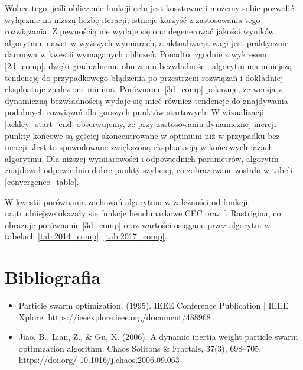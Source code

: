 \documentclass[12pt]{article}
\begin{document}
Wobec tego, jeśli obliczenie funkcji celu jest kosztowne i możemy sobie pozwolić wyłącznie na niższą liczbę iteracji, istnieje korzyść z zastosowania tego rozwiązania.
Z pewnością nie wydaje się ono degenerować jakości wyników algorytmu, nawet w wyższych wymiarach, a aktualizacja wagi jest praktycznie darmowa w kwestii wymaganych obliczeń.
Ponadto, zgodnie z wykresem \ref{2d_comp}, dzięki gradualnemu obniżaniu bezwładności, algorytm ma mniejszą tendencję do przypadkowego błądzenia po przestrzeni rozwiązań i
dokładniej eksploatuje znalezione minima. Porównanie \ref{3d_comp} pokazuje, że wersja z dynamiczną bezwładnością wydaje się mieć również tendencje do znajdywania podobnych
rozwiązań dla gorszych punktów startowych. W wizualizacji \ref{ackley_start_end} obserwujemy, że przy zastosowaniu dynamicznej inercji punkty końcowe są gęściej skoncentrowane
w optimum niż w przypadku bez inercji. Jest to spowodowane zwiększoną eksploatacją w końcowych fazach algorytmu. Dla niższej wymiarowości i odpowiednich parametrów, algorytm znajdował
odpowiednio dobre punkty szybciej, co zobrazowane zostało w tabeli \ref{convergence_table}.

W kwestii porównania zachowań algorytmu w zależności od funkcji, najtrudniejsze okazały się funkcje benchmarkowe CEC oraz f. Rastrigina, co obrazuje porównanie \ref{3d_comp} oraz wartości osiągane
przez algorytm w tabelach \ref{tab:2014_comp}, \ref{tab:2017_comp}.

\section{Bibliografia}
\begin{itemize}
	\item{Particle swarm optimization. (1995). IEEE Conference Publication | IEEE Xplore. https://ieeexplore.ieee.org/document/488968}
	\item{Jiao, B., Lian, Z., \& Gu, X. (2006). A dynamic inertia weight particle swarm optimization algorithm. Chaos Solitons \& Fractals, 37(3), 698–705. https://doi.org/ 10.1016/j.chaos.2006.09.063}
\end{itemize}
\end{document}
